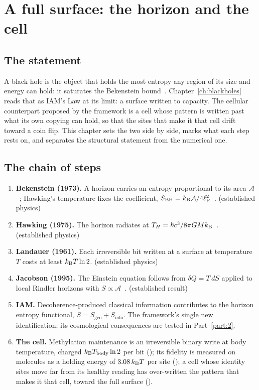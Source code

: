 \chapter{A full surface: the horizon and the cell}\label{ch:floorbreach}

\section{The statement}

A black hole is the object that holds the most entropy any region of its size and energy can hold: it saturates the
Bekenstein bound~\cite{Bekenstein1981}. Chapter~\ref{ch:blackholes} reads that as IAM's Law at its limit: a surface written to
capacity. The cellular counterpart proposed by the framework is a cell whose pattern is written past what its own copying
can hold, so that the sites that make it that cell drift toward a coin flip. This chapter sets the two side by side, marks
what each step rests on, and separates the structural statement from the numerical one.

\section{The chain of steps}

\begin{enumerate}
\item \textbf{Bekenstein (1973).} A horizon carries an entropy proportional to its area $\mathcal A$~\cite{Bekenstein1973};
      Hawking's temperature fixes the coefficient, $S_{\mathrm{BH}}=k_{\mathrm B}\mathcal A/4\ell_{\mathrm P}^2$~\cite{Hawking1975}. \derived{} (established physics)
\item \textbf{Hawking (1975).} The horizon radiates at $T_H=\hbar c^3/8\pi GMk_{\mathrm B}$~\cite{Hawking1975}. \derived{} (established physics)
\item \textbf{Landauer (1961).} Each irreversible bit written at a surface at temperature $T$ costs at least $k_{\mathrm B} T\ln2$.
      \derived{} (established physics)
\item \textbf{Jacobson (1995).} The Einstein equation follows from $\delta Q=T\,dS$ applied to local Rindler horizons with
      $S\propto\mathcal A$~\cite{Jacobson1995}. \derived{} (established result)
\item \textbf{IAM.} Decoherence-produced classical information contributes to the horizon entropy functional,
      $S=S_{\mathrm{geo}}+S_{\mathrm{info}}$. The framework's single new identification; its cosmological consequences are
      tested in Part~\ref{part:2}. \conjecture
\item \textbf{The cell.} Methylation maintenance is an irreversible binary write at body temperature, charged $k_{\mathrm B}T_{\mathrm{body}}\ln2$ per
      bit (\derived); its fidelity is measured on molecules as a holding energy of $3.08\,k_{\mathrm B} T$ per site (\measured); a cell
      whose identity sites move far from its healthy reading has over-written the pattern that makes it that cell, toward the full surface (\conjecture).
\end{enumerate}

